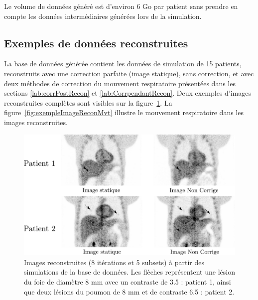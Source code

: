 Le volume de données généré est d'environ 6 Go par patient sans prendre en compte les données intermédiaires générées lors de la simulation.

\subsection{Exemples de données reconstruites}

La base de données générée contient les données de simulation de 15 patients, reconstruits avec une correction parfaite (image statique), sans correction, et avec deux méthodes de correction du mouvement respiratoire présentées dans les sections \ref{lab:corrPostRecon} et \ref{lab:CorrpendantRecon}. Deux exemples d'images reconstruites complètes sont visibles sur la figure~\ref{fig:exempleImageRecon}. La figure~\ref{fig:exempleImageReconMvt} illustre le mouvement respiratoire dans les images reconstruites.

\begin{figure}
 \centering
 \includegraphics[width=15cm]{images/exempleImageRecon}
 \caption[Images reconstruites tirées de la base de donnée]{Images reconstruites (8 itérations et 5 subsets) à partir des simulations de la base de données. Les flèches représentent une lésion du foie de diamètre 8 mm avec un contraste de 3.5 : patient 1, ainsi que deux lésions du poumon de 8 mm et de contraste 6.5 : patient 2.}
 \label{fig:exempleImageRecon}
\end{figure}

